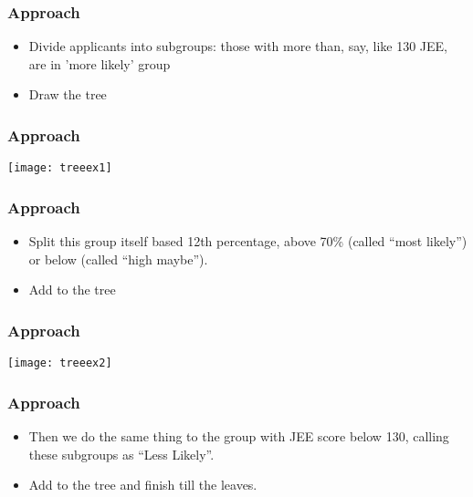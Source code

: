 \begin{frame}[fragile]\frametitle{Approach}
\begin{itemize}
	\item Divide applicants into subgroups: those with more than, say, like 130 JEE, are in 'more likely' group
	\item Draw the tree
	\end{itemize}

\end{frame}

\begin{frame}[fragile]\frametitle{Approach}
\begin{center}
\texttt{[image: treeex1]}
\end{center}
\end{frame}


\begin{frame}[fragile]\frametitle{Approach}
\begin{itemize}
	\item Split this group itself based 12th percentage, above 70\% (called ``most likely'') or below (called ``high maybe'').
	\item Add to the tree
	\end{itemize}

\end{frame}

\begin{frame}[fragile]\frametitle{Approach}
\begin{center}
\texttt{[image: treeex2]}
\end{center}
\end{frame}


\begin{frame}[fragile]\frametitle{Approach}
\begin{itemize}
	\item Then we do the same thing to the group with JEE score below 130, calling these subgroups as ``Less Likely''.
	\item Add to the tree and finish till the leaves.
	\end{itemize}

\end{frame}

